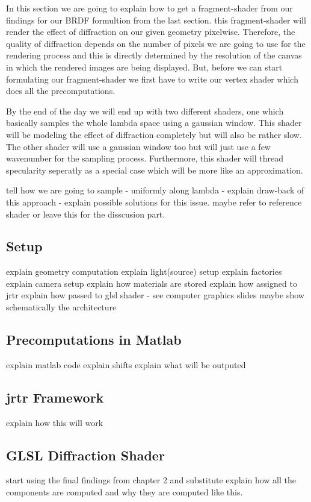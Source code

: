 In this section we are going to explain how to get a fragment-shader from our findings for our BRDF formultion from the last section.  this fragment-shader will render the effect of diffraction on our given geometry pixelwise. Therefore, the quality of diffraction depends on the number of pixels we are going to use for the rendering process and this is directly determined by the resolution of the canvas in which the rendered images are being displayed. 
But, before we can start formulating our fragment-shader we first have to write our vertex shader which does all the precomputations. 
 
By the end of the day we will end up with two different shaders, one which basically samples the whole lambda space using a gaussian window. This shader will be modeling the effect of diffraction completely but will also be rather slow. The other shader will use a gaussian window too but will just use a few wavenumber for the sampling process. Furthermore, this shader will thread specularity seperatly as a special case which will be more like an approximation. 


tell how we are going to sample - uniformly along lambda - explain draw-back of this approach - explain possible solutions for this issue. maybe refer to reference shader or leave this for the disscusion part.



\subsection{Setup}
explain geometry computation
explain light(source) setup
explain factories
explain camera setup
explain how materials are stored
explain how assigned to jrtr
explain how passed to glsl shader - see computer graphics slides
maybe show schematically the architecture
\subsection{Precomputations in Matlab}
explain matlab code
explain shifts
explain what will be outputed

\subsection{jrtr Framework}
explain how this will work
\subsection{GLSL Diffraction Shader}
start using the final findings from chapter 2 and substitute
explain how all the components are computed and why they are computed like this.

